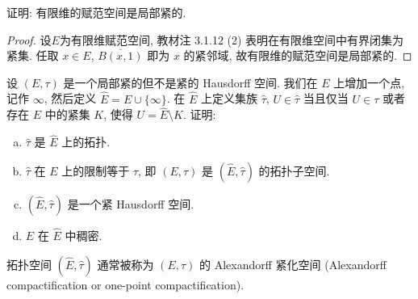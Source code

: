 \begin{exercise}
证明: 有限维的赋范空间是局部紧的.
\end{exercise}

\begin{proof}
设$E$为有限维赋范空间, 教材注 3.1.12 (2) 表明在有限维空间中有界闭集为紧集.
任取 $x\in E$, $\overline{B(x,1)}$ 即为 $x$ 的紧邻域, 故有限维的赋范空间是局部紧的.
\end{proof}

\begin{exercise}
设 $(E,\tau)$ 是一个局部紧的但不是紧的 Hausdorff 空间. 我们在 $E$ 上增加一个点,
记作 $\infty$, 然后定义 $\widehat{E}=E\cup\{\infty\}$. 在 $\widehat{E}$ 上定义集族 $\widehat{\tau}$,
$U\in\widehat{\tau}$ 当且仅当 $U\in\tau$ 或者存在 $E$ 中的紧集 $K$, 使得 $U=\widehat{E}\setminus K$. 证明:
\begin{enumerate}[(a)]
    \item $\widehat{\tau}$ 是 $\widehat{E}$ 上的拓扑.
    \item $\widehat{\tau}$ 在 $E$ 上的限制等于 $\tau$, 即 $(E,\tau)$ 是 $(\widehat{E},\widehat{\tau})$ 的拓扑子空间.
    \item $(\widehat{E},\widehat{\tau})$ 是一个紧 Hausdorff 空间.
    \item $E$ 在 $\widehat{E}$ 中稠密.
\end{enumerate}
\end{exercise}

\begin{remark}
    拓扑空间 $(\widehat{E},\widehat{\tau})$ 通常被称为 $(E,\tau)$ 的 Al\-e\-x\-a\-ndorff 紧化空间 
    (Alexandorff compactification or one-point compactification).
\end{remark}

